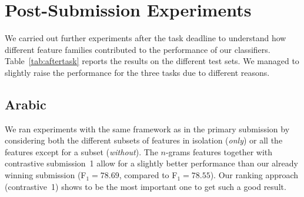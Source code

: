 \section{Post-Submission Experiments}
\label{sec:discussion}

We carried out further experiments after the task deadline to understand how 
different feature families contributed to the performance of our classifiers. 
Table~\ref{tab:aftertask} reports the results on the different test sets. We 
managed to slightly raise the performance for the three tasks due to different 
reasons.

\subsection{Arabic} \label{sec:discussionArabic}

We ran experiments with the same framework as in the primary submission by 
considering both the different subsets of features in isolation (\textit{only}) 
or all the features except for a subset (\textit{without}). The $n$-grams 
features together with contrastive submission~1 allow for a slightly better 
performance than our already winning submission (F$_1=78.69$, compared to 
F$_1=78.55$). Our ranking approach (contrastive~1) shows to be the most 
important one to get such a good result.

